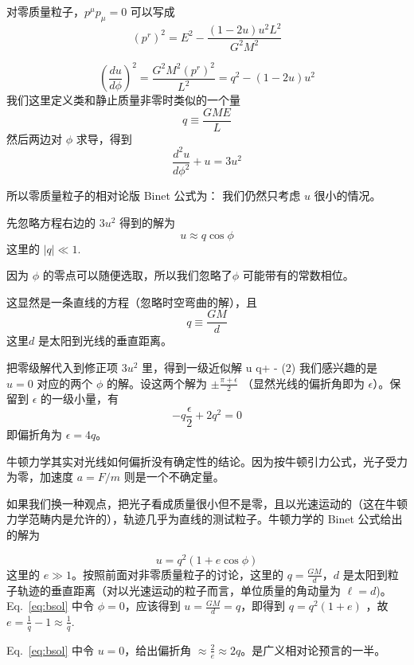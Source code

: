 \documentclass[CJK,13pt]{beamer}
\begin{document}
  \begin{frame}
    对零质量粒子，$p^\mu p_\mu = 0$ 可以写成
    \begin{equation}
     \left(p^r\right)^2 = E^2 - \frac{(1-2u)u^2L^2}{G^2M^2} \label{eq:ds2}
    \end{equation}

    \begin{equation}
      \left(\frac{du}{d\phi}\right)^2 = \frac{G^2M^2\left(p^r\right)^2}{L^2} = q^2 - (1-2u)u^2
    \end{equation}
    我们这里定义类和静止质量非零时类似的一个量
    $$q \equiv \frac{GME}{L} $$
    然后两边对 $\phi$ 求导，得到
    {\blue $$\frac{d^2u}{d\phi^2} + u = 3u^2 $$}
  \end{frame}

  \begin{frame}
    所以零质量粒子的相对论版 Binet 公式为：
    我们仍然只考虑 $u$ 很小的情况。

    \skipline
     
    先忽略方程右边的 $3u^2$ 得到的解为
    $$ u \approx q \cos \phi $$
    这里的 $|q|\ll 1$.
    
    {\scriptsize 因为 $\phi$ 的零点可以随便选取，所以我们忽略了$\phi$ 可能带有的常数相位。}

    \skipline
    
    这显然是一条直线的方程（忽略时空弯曲的解），且
    $$q \equiv \frac{GM}{d}$$
    这里$d$ 是太阳到光线的垂直距离。
  \end{frame}  


  \begin{frame}
    把零级解代入到修正项 $3u^2$ 里，得到一级近似解
    \be
    u \approx q\cos\phi +  - \cos(2\phi)
    \ee
    我们感兴趣的是 $u=0$ 对应的两个 $\phi$ 的解。设这两个解为 $\pm\frac{\pi+\epsilon}{2}$ （显然光线的偏折角即为 $\epsilon$）。保留到 $\epsilon$ 的一级小量，有
    $$ -q\frac{\epsilon}{2} + 2q^2 = 0$$
    即偏折角为 $\epsilon = 4q$。
  \end{frame}

  \begin{frame}
    牛顿力学其实对光线如何偏折没有确定性的结论。因为按牛顿引力公式，光子受力为零，加速度 $a=F/m$ 则是一个不确定量。

    \skipline
    
    如果我们换一种观点，把光子看成质量很小但不是零，且以光速运动的（这在牛顿力学范畴内是允许的），轨迹几乎为直线的测试粒子。牛顿力学的 Binet 公式给出的解为

    \begin{equation}
      u = q^2(1+e\cos\phi) \label{eq:bsol}
    \end{equation}
    这里的 $e\gg 1$。按照前面对非零质量粒子的讨论，这里的 $q = \frac{GM}{d}$，$d$ 是太阳到粒子轨迹的垂直距离（对以光速运动的粒子而言，单位质量的角动量为 $\ell = d$)。Eq.~\eqref{eq:bsol} 中令 $\phi = 0$，应该得到 $u=\frac{GM}{d}=q$，即得到 $q = q^2(1+e)$ ，故$e =  \frac{1}{q}-1\approx\frac{1}{q}$.

      \skipline
    
    Eq.~\eqref{eq:bsol} 中令 $u=0$，给出偏折角 $\approx \frac{2}{e}\approx 2q$。是广义相对论预言的一半。
  \end{frame}  
  
\end{document}

